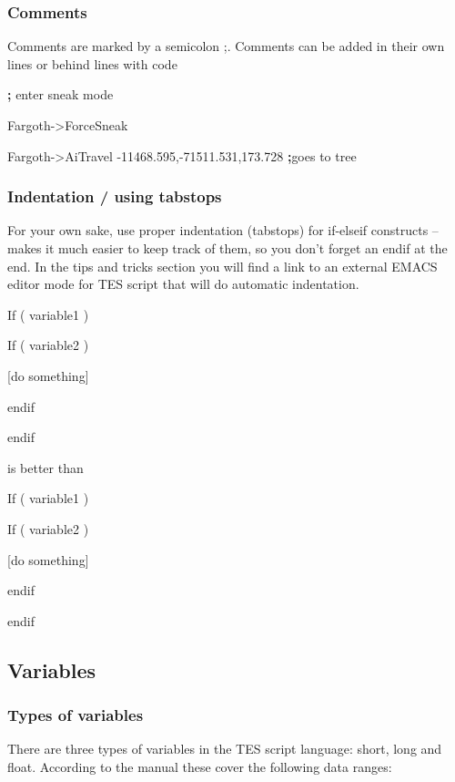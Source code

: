 \documentclass[
]{article}
\begin{document}
\hypertarget{comments}{%
\subsubsection{Comments}\label{comments}}

Comments are marked by a semicolon ;. Comments can be added in their own
lines or behind lines with code

\textbf{;} enter sneak mode

Fargoth-\textgreater ForceSneak

Fargoth-\textgreater AiTravel -11468.595,-71511.531,173.728
\textbf{;}goes to tree

\hypertarget{indentation-using-tabstops}{%
\subsubsection{Indentation / using
tabstops}\label{indentation-using-tabstops}}

For your own sake, use proper indentation (tabstops) for if-elseif
constructs -- makes it much easier to keep track of them, so you don't
forget an endif at the end. In the tips and tricks section you will find
a link to an external EMACS editor mode for TES script that will do
automatic indentation.

If ( variable1 )

If ( variable2 )

{[}do something{]}

endif

endif

is better than

If ( variable1 )

If ( variable2 )

{[}do something{]}

endif

endif

\hypertarget{variables}{%
\subsection{Variables}\label{variables}}

\hypertarget{types-of-variables}{%
\subsubsection{Types of variables}\label{types-of-variables}}

There are three types of variables in the TES script language: short,
long and float. According to the manual these cover the following data
ranges:
\end{document}
